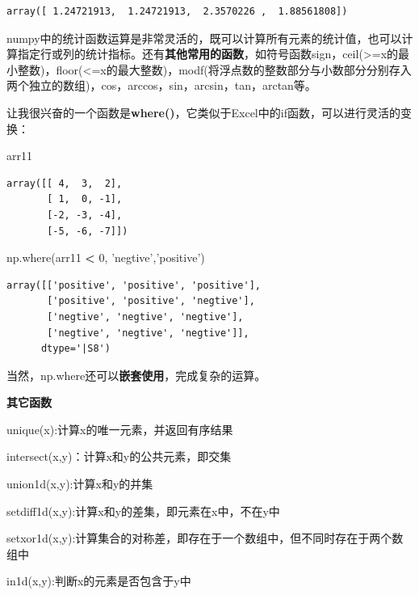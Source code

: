 \documentclass[]{article}
\newenvironment{Shaded}{\begin{snugshade}}{\end{snugshade}}
\newcommand{\DecValTok}[1]{\textcolor[rgb]{0.00,0.00,0.81}{#1}}
\newcommand{\StringTok}[1]{\textcolor[rgb]{0.31,0.60,0.02}{#1}}
\newcommand{\OperatorTok}[1]{\textcolor[rgb]{0.81,0.36,0.00}{\textbf{#1}}}
\newcommand{\NormalTok}[1]{#1}
\begin{document}
\begin{verbatim}
array([ 1.24721913,  1.24721913,  2.3570226 ,  1.88561808])
\end{verbatim}

numpy中的统计函数运算是非常灵活的，既可以计算所有元素的统计值，也可以计算指定行或列的统计指标。还有\textbf{其他常用的函数}，如符号函数sign，ceil(\textgreater{}=x的最小整数)，floor(\textless{}=x的最大整数)，modf(将浮点数的整数部分与小数部分分别存入两个独立的数组)，cos，arccos，sin，arcsin，tan，arctan等。

让我很兴奋的一个函数是\textbf{where()}，它类似于Excel中的if函数，可以进行灵活的变换：

\begin{Shaded}
\begin{Highlighting}[]
\NormalTok{arr11}
\end{Highlighting}
\end{Shaded}

\begin{verbatim}
array([[ 4,  3,  2],
       [ 1,  0, -1],
       [-2, -3, -4],
       [-5, -6, -7]])
\end{verbatim}

\begin{Shaded}
\begin{Highlighting}[]
\NormalTok{np.where(arr11 }\OperatorTok{<} \DecValTok{0}\NormalTok{, }\StringTok{'negtive'}\NormalTok{,}\StringTok{'positive'}\NormalTok{)}
\end{Highlighting}
\end{Shaded}

\begin{verbatim}
array([['positive', 'positive', 'positive'],
       ['positive', 'positive', 'negtive'],
       ['negtive', 'negtive', 'negtive'],
       ['negtive', 'negtive', 'negtive']], 
      dtype='|S8')
\end{verbatim}

当然，np.where还可以\textbf{嵌套使用}，完成复杂的运算。

\textbf{其它函数}

unique(x):计算x的唯一元素，并返回有序结果

intersect(x,y)：计算x和y的公共元素，即交集

union1d(x,y):计算x和y的并集

setdiff1d(x,y):计算x和y的差集，即元素在x中，不在y中

setxor1d(x,y):计算集合的对称差，即存在于一个数组中，但不同时存在于两个数组中

in1d(x,y):判断x的元素是否包含于y中
\end{document}
